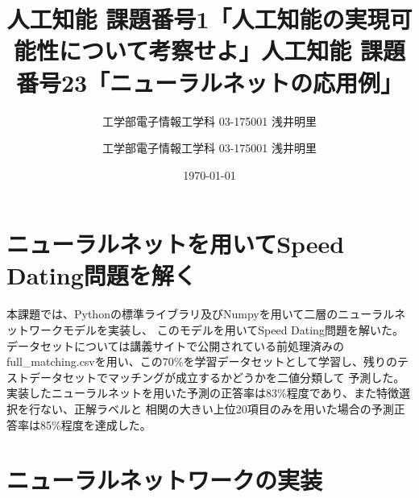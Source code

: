 \documentclass[uplatex]{jsarticle}
\title{人工知能 課題番号1「人工知能の実現可能性について考察せよ」}
\author{工学部電子情報工学科 03-175001 浅井明里}
\title{人工知能 課題番号23「ニューラルネットの応用例」}
\author{工学部電子情報工学科 03-175001 浅井明里}
\date{\today}
\makeatletter
\def\maketitle{%
  \null
  \thispagestyle{empty}%
  \vfill
  \begin{center}\leavevmode
    \normalfont
    {\LARGE \@title\par}%
    \vskip 1cm
    {\Large \@author\par}%
    \vskip 1cm
    {\Large \@date\par}%
  \end{center}%
  \vfill
  \null
  \@thanks%
  \cleardoublepage
  }
\makeatother
\begin{document}
\maketitle


\section{ニューラルネットを用いてSpeed Dating問題を解く}
本課題では、Pythonの標準ライブラリ及びNumpyを用いて二層のニューラルネットワークモデルを実装し、
このモデルを用いてSpeed Dating問題を解いた。データセットについては講義サイトで公開されている前処理済みの
full\_matching.csvを用い、この70\%を学習データセットとして学習し、残りのテストデータセットでマッチングが成立するかどうかを二値分類して
予測した。実装したニューラルネットを用いた予測の正答率は83\%程度であり、また特徴選択を行ない、正解ラベルと
相関の大きい上位20項目のみを用いた場合の予測正答率は85\%程度を達成した。

\section{ニューラルネットワークの実装}
\end{document}
